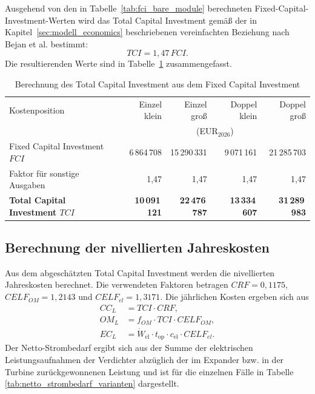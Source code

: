 Ausgehend von den in Tabelle~\ref{tab:fci_bare_module} berechneten
Fixed-Capital-Investment-Werten wird das Total Capital Investment gemäß der in
Kapitel~\ref{sec:modell_economics} beschriebenen vereinfachten Beziehung nach
Bejan et al. bestimmt:
\begin{equation}
TCI = 1{,}47\,FCI .
\end{equation}
Die resultierenden Werte sind in Tabelle~\ref{tab:tci_berechnung}
zusammengefasst.

\begin{table}[H]
\centering
\caption{Berechnung des Total Capital Investment aus dem Fixed Capital Investment}
\label{tab:tci_berechnung}
\small
\begin{tabular}{lrrrr}
\hline
Kostenposition
& Einzel klein
& Einzel groß
& Doppel klein
& Doppel groß \\
& \multicolumn{4}{c}{(EUR$_{2026}$)} \\
\hline
Fixed Capital Investment \(FCI\)
& 6\,864\,708
& 15\,290\,331
& 9\,071\,161
& 21\,285\,703 \\

Faktor für sonstige Ausgaben
& 1{,}47
& 1{,}47
& 1{,}47
& 1{,}47 \\

\textbf{Total Capital Investment \(TCI\)}
& \textbf{10\,091\,121}
& \textbf{22\,476\,787}
& \textbf{13\,334\,607}
& \textbf{31\,289\,983} \\
\hline
\end{tabular}
\end{table}

\subsection*{Berechnung der nivellierten Jahreskosten}

Aus dem abgeschätzten Total Capital Investment werden die nivellierten
Jahreskosten berechnet. Die verwendeten Faktoren betragen
\(CRF=0{,}1175\), \(CELF_{OM}=1{,}2143\) und \(CELF_{el}=1{,}3171\).
Die jährlichen Kosten ergeben sich aus
\begin{align}
CC_L &= TCI \cdot CRF,\\
OM_L &= f_{OM}\cdot TCI \cdot CELF_{OM},\\
EC_L &= \dot W_\mathrm{el} \cdot t_\mathrm{op} \cdot c_\mathrm{el} \cdot CELF_{el}.
\end{align}
Der Netto-Strombedarf ergibt sich aus der Summe der elektrischen
Leistungsaufnahmen der Verdichter abzüglich der im Expander bzw. in der
Turbine zurückgewonnenen Leistung und ist für die einzelnen Fälle in Tabelle \ref{tab:netto_strombedarf_varianten} dargestellt.

